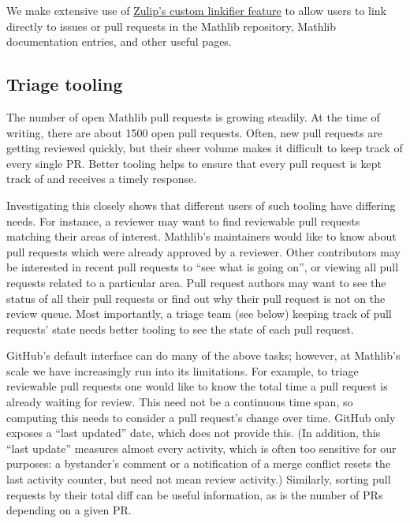 \documentclass[runningheads]{llncs}
\def\Mathlib{Mathlib\xspace}
\def\mathlib{Mathlib\xspace}
\begin{document}
We make extensive use of \href{https://zulip.com/help/add-a-custom-linkifier}{Zulip's custom linkifier feature} to allow users to link directly to issues or pull requests in the \mathlib repository, \mathlib documentation entries, and other useful pages.


\subsection{Triage tooling}
\label{sec:triageTooling}

The number of open \mathlib pull requests is growing steadily. At the time of writing, there are about 1500 open pull requests.
Often, new pull requests are getting reviewed quickly, but their sheer volume makes it difficult to keep track of every single PR.
Better tooling helps to ensure that every pull request is kept track of and receives a timely response.

Investigating this closely shows that different users of such tooling have differing needs. For instance, a reviewer may want to find reviewable pull requests matching their areas of interest. \Mathlib's maintainers would like to know about pull requests which were already approved by a reviewer.
Other contributors may be interested in recent pull requests to ``see what is going on'', or viewing all pull requests related to a particular area. Pull request authors may want to see the status of all their pull requests or find out why their pull request is not on the review queue.
Most importantly, a triage team (see below) keeping track of pull requests' state needs better tooling to see the state of each pull request.

GitHub's default interface can do many of the above tasks; however, at \mathlib's scale we have increasingly run into its limitations. For example, to triage reviewable pull requests one would like to know the total time a pull request is already waiting for review. This need not be a continuous time span, so computing this needs to consider a pull request's change over time. GitHub only exposes a ``last updated'' date, which does not provide this. (In addition, this ``last update'' measures almost every activity, which is often too sensitive for our purposes: a bystander's comment or a notification of a merge conflict resets the last activity counter, but need not mean review activity.) Similarly, sorting pull requests by their total diff can be useful information, as is the number of PRs depending on a given PR.
\end{document}
